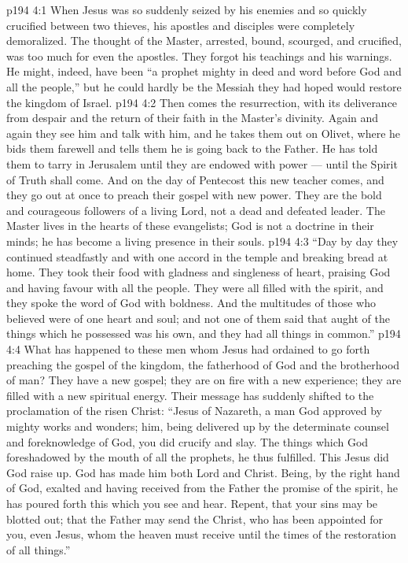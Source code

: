 \vs p194 4:1 When Jesus was so suddenly seized by his enemies and so quickly crucified between two thieves, his apostles and disciples were completely demoralized. The thought of the Master, arrested, bound, scourged, and crucified, was too much for even the apostles. They forgot his teachings and his warnings. He might, indeed, have been “a prophet mighty in deed and word before God and all the people,” but he could hardly be the Messiah they had hoped would restore the kingdom of Israel.
\vs p194 4:2 Then comes the resurrection, with its deliverance from despair and the return of their faith in the Master’s divinity. Again and again they see him and talk with him, and he takes them out on Olivet, where he bids them farewell and tells them he is going back to the Father. He has told them to tarry in Jerusalem until they are endowed with power --- until the Spirit of Truth shall come. And on the day of Pentecost this new teacher comes, and they go out at once to preach their gospel with new power. They are the bold and courageous followers of a living Lord, not a dead and defeated leader. The Master lives in the hearts of these evangelists; God is not a doctrine in their minds; he has become a living presence in their souls.
\vs p194 4:3 “Day by day they continued steadfastly and with one accord in the temple and breaking bread at home. They took their food with gladness and singleness of heart, praising God and having favour with all the people. They were all filled with the spirit, and they spoke the word of God with boldness. And the multitudes of those who believed were of one heart and soul; and not one of them said that aught of the things which he possessed was his own, and they had all things in common.”
\vs p194 4:4 \pc What has happened to these men whom Jesus had ordained to go forth preaching the gospel of the kingdom, the fatherhood of God and the brotherhood of man? They have a new gospel; they are on fire with a new experience; they are filled with a new spiritual energy. Their message has suddenly shifted to the proclamation of the risen Christ: “Jesus of Nazareth, a man God approved by mighty works and wonders; him, being delivered up by the determinate counsel and foreknowledge of God, you did crucify and slay. The things which God foreshadowed by the mouth of all the prophets, he thus fulfilled. This Jesus did God raise up. God has made him both Lord and Christ. Being, by the right hand of God, exalted and having received from the Father the promise of the spirit, he has poured forth this which you see and hear. Repent, that your sins may be blotted out; that the Father may send the Christ, who has been appointed for you, even Jesus, whom the heaven must receive until the times of the restoration of all things.”
